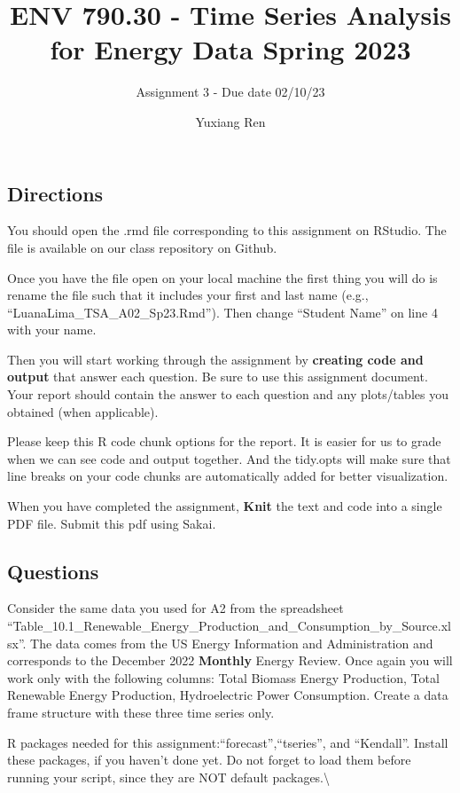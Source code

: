 \documentclass[
]{article}
\title{ENV 790.30 - Time Series Analysis for Energy Data \textbar{}
Spring 2023}
\subtitle{Assignment 3 - Due date 02/10/23}
\author{Yuxiang Ren}
\date{}
\begin{document}
\maketitle

\hypertarget{directions}{%
\subsection{Directions}\label{directions}}

You should open the .rmd file corresponding to this assignment on
RStudio. The file is available on our class repository on Github.

Once you have the file open on your local machine the first thing you
will do is rename the file such that it includes your first and last
name (e.g., ``LuanaLima\_TSA\_A02\_Sp23.Rmd''). Then change ``Student
Name'' on line 4 with your name.

Then you will start working through the assignment by \textbf{creating
code and output} that answer each question. Be sure to use this
assignment document. Your report should contain the answer to each
question and any plots/tables you obtained (when applicable).

Please keep this R code chunk options for the report. It is easier for
us to grade when we can see code and output together. And the tidy.opts
will make sure that line breaks on your code chunks are automatically
added for better visualization.

When you have completed the assignment, \textbf{Knit} the text and code
into a single PDF file. Submit this pdf using Sakai.

\hypertarget{questions}{%
\subsection{Questions}\label{questions}}

Consider the same data you used for A2 from the spreadsheet
``Table\_10.1\_Renewable\_Energy\_Production\_and\_Consumption\_by\_Source.xlsx''.
The data comes from the US Energy Information and Administration and
corresponds to the December 2022 \textbf{Monthly} Energy Review. Once
again you will work only with the following columns: Total Biomass
Energy Production, Total Renewable Energy Production, Hydroelectric
Power Consumption. Create a data frame structure with these three time
series only.

R packages needed for this assignment:``forecast'',``tseries'', and
``Kendall''. Install these packages, if you haven't done yet. Do not
forget to load them before running your script, since they are NOT
default packages.\textbackslash{}
\end{document}
